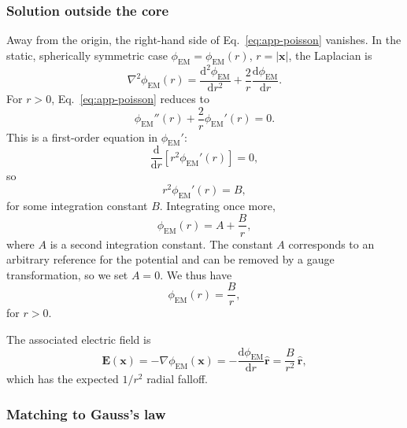 \documentclass[11pt]{article}
\newcommand{\dd}{\mathrm{d}}
\begin{document}
\subsubsection{Solution outside the core}

Away from the origin, the right-hand side of Eq.~\eqref{eq:app-poisson} vanishes.  In the static, spherically symmetric case $\phi_{\mathrm{EM}} = \phi_{\mathrm{EM}}(r)$, $r = |\mathbf{x}|$, the Laplacian is
\begin{equation}
\nabla^2 \phi_{\mathrm{EM}}(r)
= \frac{\dd^2 \phi_{\mathrm{EM}}}{\dd r^2}
 + \frac{2}{r}\frac{\dd \phi_{\mathrm{EM}}}{\dd r}.
\label{eq:app-laplacian-radial}
\end{equation}
For $r>0$, Eq.~\eqref{eq:app-poisson} reduces to
\begin{equation}
\phi_{\mathrm{EM}}''(r) + \frac{2}{r}\phi_{\mathrm{EM}}'(r) = 0.
\label{eq:app-radial-laplace}
\end{equation}
This is a first-order equation in $\phi_{\mathrm{EM}}'$:
\begin{equation}
\frac{\dd}{\dd r}\left[r^2 \phi_{\mathrm{EM}}'(r)\right] = 0,
\end{equation}
so
\begin{equation}
r^2 \phi_{\mathrm{EM}}'(r) = B,
\end{equation}
for some integration constant $B$.  Integrating once more,
\begin{equation}
\phi_{\mathrm{EM}}(r) = A + \frac{B}{r},
\end{equation}
where $A$ is a second integration constant.  The constant $A$ corresponds to an arbitrary reference for the potential and can be removed by a gauge transformation, so we set $A=0$.  We thus have
\begin{equation}
\phi_{\mathrm{EM}}(r) = \frac{B}{r},
\label{eq:app-phi-Br}
\end{equation}
for $r>0$.

The associated electric field is
\begin{equation}
\mathbf{E}(\mathbf{x})
= -\nabla \phi_{\mathrm{EM}}(\mathbf{x})
= -\frac{\dd \phi_{\mathrm{EM}}}{\dd r}\hat{\mathbf{r}}
= \frac{B}{r^2}\,\hat{\mathbf{r}},
\label{eq:app-E-Br}
\end{equation}
which has the expected $1/r^2$ radial falloff.

\subsubsection{Matching to Gauss's law}
\end{document}
